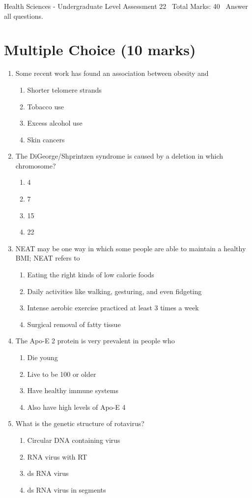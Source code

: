 \documentclass[12pt]{article}
\begin{document}
\begin{center}
Health Sciences - Undergraduate Level Assessment 22 \
Total Marks: 40 \
Answer all questions.
\end{center}

\section*{Multiple Choice (10 marks)}
\begin{enumerate}[label=\arabic*.]
\item Some recent work has found an association between obesity and
\begin{enumerate}[label=(\alph*)]
    \item Shorter telomere strands
    \item Tobacco use
    \item Excess alcohol use
    \item Skin cancers
\end{enumerate}
\item The DiGeorge/Shprintzen syndrome is caused by a deletion in which chromosome?
\begin{enumerate}[label=(\alph*)]
    \item 4
    \item 7
    \item 15
    \item 22
\end{enumerate}
\item NEAT may be one way in which some people are able to maintain a healthy BMI; NEAT refers to
\begin{enumerate}[label=(\alph*)]
    \item Eating the right kinds of low calorie foods
    \item Daily activities like walking, gesturing, and even fidgeting
    \item Intense aerobic exercise practiced at least 3 times a week
    \item Surgical removal of fatty tissue
\end{enumerate}
\item The Apo-E 2 protein is very prevalent in people who
\begin{enumerate}[label=(\alph*)]
    \item Die young
    \item Live to be 100 or older
    \item Have healthy immune systems
    \item Also have high levels of Apo-E 4
\end{enumerate}
\item What is the genetic structure of rotavirus?
\begin{enumerate}[label=(\alph*)]
    \item Circular DNA containing virus
    \item RNA virus with RT
    \item ds RNA virus
    \item ds RNA virus in segments
\end{enumerate}
\end{enumerate}
\end{document}
